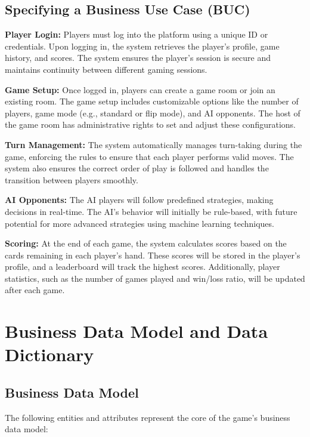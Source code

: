 \documentclass{article}
\begin{document}
\subsection{Specifying a Business Use Case (BUC)}

\textbf{Player Login:} Players must log into the platform using a unique ID or credentials. Upon logging in, the system retrieves the player's profile, game history, and scores. The system ensures the player's session is secure and maintains continuity between different gaming sessions.

\textbf{Game Setup:} Once logged in, players can create a game room or join an existing room. The game setup includes customizable options like the number of players, game mode (e.g., standard or flip mode), and AI opponents. The host of the game room has administrative rights to set and adjust these configurations.

\textbf{Turn Management:} The system automatically manages turn-taking during the game, enforcing the rules to ensure that each player performs valid moves. The system also ensures the correct order of play is followed and handles the transition between players smoothly.

\textbf{AI Opponents:} The AI players will follow predefined strategies, making decisions in real-time. The AI’s behavior will initially be rule-based, with future potential for more advanced strategies using machine learning techniques.

\textbf{Scoring:} At the end of each game, the system calculates scores based on the cards remaining in each player's hand. These scores will be stored in the player's profile, and a leaderboard will track the highest scores. Additionally, player statistics, such as the number of games played and win/loss ratio, will be updated after each game.

\section{Business Data Model and Data Dictionary}

\subsection{Business Data Model}
The following entities and attributes represent the core of the game’s business data model:
\end{document}
